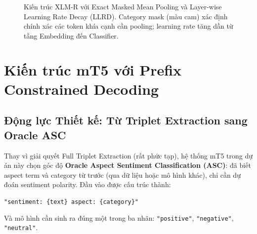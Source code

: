 \documentclass[12pt,a4paper,oneside]{report}
\begin{document}
\begin{figure}[ht]
{
}
\caption{Kiến trúc XLM-R với Exact Masked Mean Pooling và Layer-wise Learning Rate Decay (LLRD). Category mask (màu cam) xác định chính xác các token khía cạnh cần pooling; learning rate tăng dần từ tầng Embedding đến Classifier.}
\label{fig:xlmr_full}
\end{figure}

\section{Kiến trúc mT5 với Prefix Constrained Decoding}

\subsection{Động lực Thiết kế: Từ Triplet Extraction sang Oracle ASC}

Thay vì giải quyết Full Triplet Extraction (rất phức tạp), hệ thống mT5 trong dự án này chọn góc độ \textbf{Oracle Aspect Sentiment Classification (ASC)}: đã biết aspect term và category từ trước (qua dữ liệu hoặc mô hình khác), chỉ cần dự đoán sentiment polarity. Đầu vào được cấu trúc thành:
\begin{center}
\texttt{"sentiment: \{text\} aspect: \{category\}"}
\end{center}
Và mô hình cần sinh ra đúng một trong ba nhãn: \texttt{"positive"}, \texttt{"negative"}, \texttt{"neutral"}.
\end{document}
